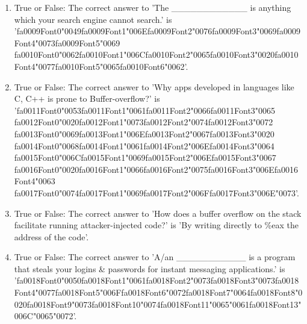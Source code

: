 \documentclass[12pt]{article}
\begin{document}
\begin{enumerate}[label=\arabic*.]
\item True or False: The correct answer to 'The \_\_\_\_\_\_\_\_\_\_\_\_ is anything which your search engine cannot search.' is '{\csname fa0009Font0\endcsname\char"0049}{\csname fa0009Font1\endcsname\char"006E}{\csname fa0009Font2\endcsname\char"0076}{\csname fa0009Font3\endcsname\char"0069}{\csname fa0009Font4\endcsname\char"0073}{\csname fa0009Font5\endcsname\char"0069} {\csname fa0010Font0\endcsname\char"0062}{\csname fa0010Font1\endcsname\char"006C}{\csname fa0010Font2\endcsname\char"0065}{\csname fa0010Font3\endcsname\char"0020}{\csname fa0010Font4\endcsname\char"0077}{\csname fa0010Font5\endcsname\char"0065}{\csname fa0010Font6\endcsname\char"0062}'.
\item True or False: The correct answer to 'Why apps developed in languages like C, C++ is prone to Buffer-overflow?' is '{\csname fa0011Font0\endcsname\char"0053}{\csname fa0011Font1\endcsname\char"0061}{\csname fa0011Font2\endcsname\char"0066}{\csname fa0011Font3\endcsname\char"0065} {\csname fa0012Font0\endcsname\char"0020}{\csname fa0012Font1\endcsname\char"0073}{\csname fa0012Font2\endcsname\char"0074}{\csname fa0012Font3\endcsname\char"0072} {\csname fa0013Font0\endcsname\char"0069}{\csname fa0013Font1\endcsname\char"006E}{\csname fa0013Font2\endcsname\char"0067}{\csname fa0013Font3\endcsname\char"0020} {\csname fa0014Font0\endcsname\char"0068}{\csname fa0014Font1\endcsname\char"0061}{\csname fa0014Font2\endcsname\char"006E}{\csname fa0014Font3\endcsname\char"0064} {\csname fa0015Font0\endcsname\char"006C}{\csname fa0015Font1\endcsname\char"0069}{\csname fa0015Font2\endcsname\char"006E}{\csname fa0015Font3\endcsname\char"0067} {\csname fa0016Font0\endcsname\char"0020}{\csname fa0016Font1\endcsname\char"0066}{\csname fa0016Font2\endcsname\char"0075}{\csname fa0016Font3\endcsname\char"006E}{\csname fa0016Font4\endcsname\char"0063} {\csname fa0017Font0\endcsname\char"0074}{\csname fa0017Font1\endcsname\char"0069}{\csname fa0017Font2\endcsname\char"006F}{\csname fa0017Font3\endcsname\char"006E}{\char"0073}'.
\item True or False: The correct answer to 'How does a buffer overflow on the stack facilitate running attacker-injected code?' is 'By writing directly to \%eax the address of the code'.
\item True or False: The correct answer to 'A/an \_\_\_\_\_\_\_\_\_\_\_ is a program that steals your logins \& passwords for instant messaging applications.' is '{\csname fa0018Font0\endcsname\char"0050}{\csname fa0018Font1\endcsname\char"0061}{\csname fa0018Font2\endcsname\char"0073}{\csname fa0018Font3\endcsname\char"0073}{\csname fa0018Font4\endcsname\char"0077}{\csname fa0018Font5\endcsname\char"006F}{\csname fa0018Font6\endcsname\char"0072}{\csname fa0018Font7\endcsname\char"0064}{\csname fa0018Font8\endcsname\char"0020}{\csname fa0018Font9\endcsname\char"0073}{\csname fa0018Font10\endcsname\char"0074}{\csname fa0018Font11\endcsname\char"0065}{\char"0061}{\csname fa0018Font13\endcsname\char"006C}{\char"0065}{\char"0072}'.

\end{enumerate}
\end{document}
